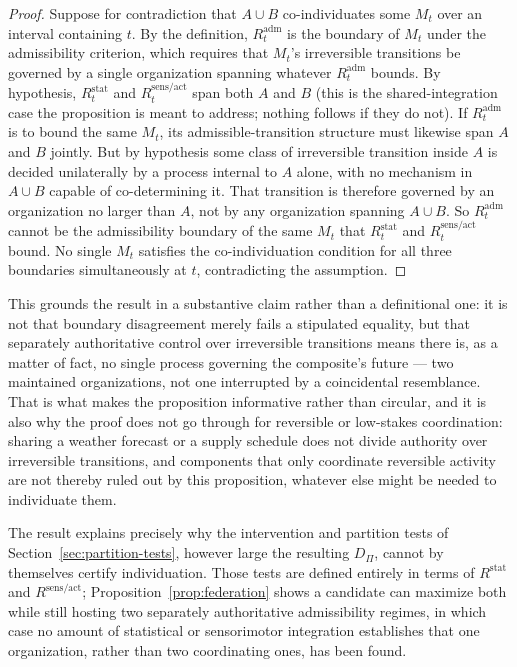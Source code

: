 \documentclass[11pt]{article}
\begin{document}
\begin{proof}
Suppose for contradiction that $A\cup B$ co-individuates some $M_t$ over an interval containing $t$. By the definition, $R^{\mathrm{adm}}_t$ is the boundary of $M_t$ under the admissibility criterion, which requires that $M_t$'s irreversible transitions be governed by a single organization spanning whatever $R^{\mathrm{adm}}_t$ bounds. By hypothesis, $R^{\mathrm{stat}}_t$ and $R^{\mathrm{sens/act}}_t$ span both $A$ and $B$ (this is the shared-integration case the proposition is meant to address; nothing follows if they do not). If $R^{\mathrm{adm}}_t$ is to bound the same $M_t$, its admissible-transition structure must likewise span $A$ and $B$ jointly. But by hypothesis some class of irreversible transition inside $A$ is decided unilaterally by a process internal to $A$ alone, with no mechanism in $A\cup B$ capable of co-determining it. That transition is therefore governed by an organization no larger than $A$, not by any organization spanning $A\cup B$. So $R^{\mathrm{adm}}_t$ cannot be the admissibility boundary of the same $M_t$ that $R^{\mathrm{stat}}_t$ and $R^{\mathrm{sens/act}}_t$ bound. No single $M_t$ satisfies the co-individuation condition for all three boundaries simultaneously at $t$, contradicting the assumption.
\end{proof}

This grounds the result in a substantive claim rather than a definitional one: it is not that boundary disagreement merely fails a stipulated equality, but that separately authoritative control over irreversible transitions means there is, as a matter of fact, no single process governing the composite's future --- two maintained organizations, not one interrupted by a coincidental resemblance. That is what makes the proposition informative rather than circular, and it is also why the proof does not go through for reversible or low-stakes coordination: sharing a weather forecast or a supply schedule does not divide authority over irreversible transitions, and components that only coordinate reversible activity are not thereby ruled out by this proposition, whatever else might be needed to individuate them.

The result explains precisely why the intervention and partition tests of Section~\ref{sec:partition-tests}, however large the resulting $D_\Pi$, cannot by themselves certify individuation. Those tests are defined entirely in terms of $R^{\mathrm{stat}}$ and $R^{\mathrm{sens/act}}$; Proposition~\ref{prop:federation} shows a candidate can maximize both while still hosting two separately authoritative admissibility regimes, in which case no amount of statistical or sensorimotor integration establishes that one organization, rather than two coordinating ones, has been found.
\end{document}
